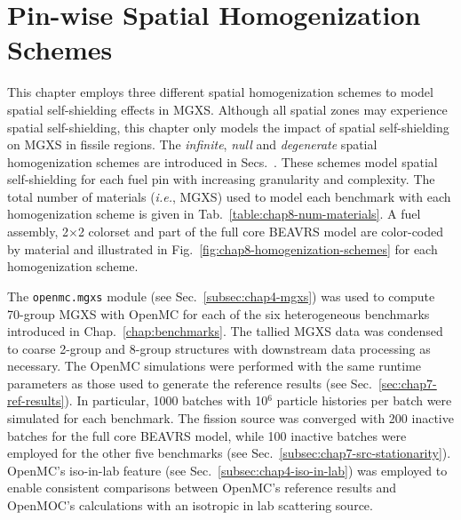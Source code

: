 \section{Pin-wise Spatial Homogenization Schemes}
\label{sec:chap8-pinwise-space-homogenize}

This chapter employs three different spatial homogenization schemes to model spatial self-shielding effects in \ac{MGXS}. Although all spatial zones may experience spatial self-shielding, this chapter only models the impact of spatial self-shielding on \ac{MGXS} in fissile regions. The \textit{infinite}, \textit{null} and \textit{degenerate} spatial homogenization schemes are introduced in Secs.~. These schemes model spatial self-shielding for each fuel pin with increasing granularity and complexity. The total number of materials (\textit{i.e.}, \ac{MGXS}) used to model each benchmark with each homogenization scheme is given in Tab.~\ref{table:chap8-num-materials}. A fuel assembly, 2$\times$2 colorset and part of the full core \ac{BEAVRS} model are color-coded by material and illustrated in Fig.~\ref{fig:chap8-homogenization-schemes} for each homogenization scheme.

The \texttt{openmc.mgxs} module (see Sec.~\ref{subsec:chap4-mgxs}) was used to compute 70-group \ac{MGXS} with OpenMC for each of the six heterogeneous benchmarks introduced in Chap.~\ref{chap:benchmarks}. The tallied \ac{MGXS} data was condensed to coarse 2-group and 8-group structures with downstream data processing as necessary. The OpenMC simulations were performed with the same runtime parameters as those used to generate the reference results (see Sec.~\ref{sec:chap7-ref-results}). In particular, 1000 batches with 10$^{6}$ particle histories per batch were simulated for each benchmark. The fission source was converged with 200 inactive batches for the full core \ac{BEAVRS} model, while 100 inactive batches were employed for the other five benchmarks (see Sec.~\ref{subsec:chap7-src-stationarity}). OpenMC's iso-in-lab feature (see Sec.~\ref{subsec:chap4-iso-in-lab}) was employed to enable consistent comparisons between OpenMC's reference results and OpenMOC's calculations with an isotropic in lab scattering source.

